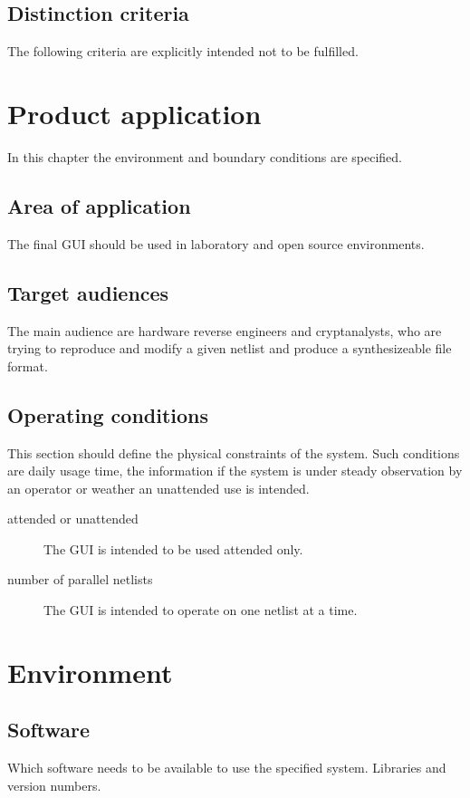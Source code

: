 \documentclass[a4paper]{scrreprt}
\begin{document}
 
\section{Distinction criteria}
The following criteria are explicitly intended not to be fulfilled.
 
\chapter{Product application}
In this chapter the environment and boundary conditions are specified.

\section{Area of application}
The final GUI should be used in laboratory and open source environments. 

\section{Target audiences}
The main audience are hardware reverse engineers and cryptanalysts, who are trying to reproduce and modify a given netlist and produce a synthesizeable file format.
 
\section{Operating conditions}
This section should define the physical constraints of the system. Such conditions are daily usage time, the information if the system is under steady observation by an operator or weather an unattended use is intended.

\begin{description}
  \item[attended or unattended] The GUI is intended to be used attended only.
  \item[number of parallel netlists] The GUI is intended to operate on one netlist at a time.
\end{description}

 
\chapter{Environment}
 
\section{Software}
Which software needs to be available to use the specified system. Libraries and version numbers.
\end{document}
